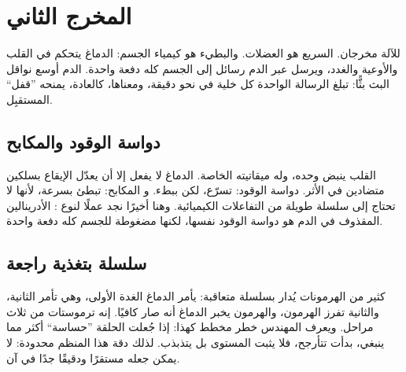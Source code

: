 \chapter{المخرج الثاني}

للآلة مخرجان. السريع هو العضلات. والبطيء هو كيمياء الجسم: الدماغ يتحكم في القلب والأوعية والغدد، ويرسل عبر الدم رسائل إلى الجسم كله دفعة واحدة. الدم أوسع نواقل البث بثًّا: تبلغ الرسالة الواحدة كل خلية في نحو دقيقة، ومعناها، كالعادة، يمنحه ”قفل“ المستقبِل.

\section*{دواسة الوقود والمكابح}

القلب ينبض وحده، وله ميقاتيته الخاصة. الدماغ لا يفعل إلا أن يعدّل الإيقاع بسلكين متضادين في الأثر.  دواسة الوقود: تسرّع، لكن ببطء. و المكابح: تبطئ بسرعة، لأنها لا تحتاج إلى سلسلة طويلة من التفاعلات الكيميائية. وهنا أخيرًا نجد عملًا لنوع : الأدرينالين المقذوف في الدم هو دواسة الوقود نفسها، لكنها مضغوطة للجسم كله دفعة واحدة.


\section*{سلسلة بتغذية راجعة}

كثير من الهرمونات يُدار بسلسلة متعاقبة: يأمر الدماغ الغدة الأولى، وهي تأمر الثانية، والثانية تفرز الهرمون، والهرمون يخبر الدماغ أنه صار كافيًا. إنه ترموستات من ثلاث مراحل. ويعرف المهندس خطر مخطط كهذا: إذا جُعلت الحلقة ”حساسة“ أكثر مما ينبغي، بدأت تتأرجح، فلا يثبت المستوى بل يتذبذب. لذلك دقة هذا المنظم محدودة: لا يمكن جعله مستقرًا ودقيقًا جدًا في آن.

